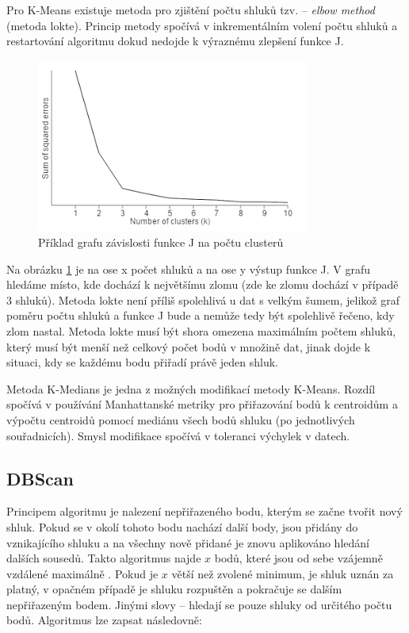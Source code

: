 \documentclass[pdftex,a4paper]{article}
\begin{document}
Pro K-Means existuje metoda pro zjištění počtu shluků tzv. -- \textit{elbow method} (metoda lokte). Princip metody spočívá v inkrementálním volení počtu shluků a restartování algoritmu dokud nedojde k výraznému zlepšení funkce J.

\begin{figure}[h]
	\centering
	\includegraphics[width=0.8\textwidth]{res/elbow.png}
	\caption{Příklad grafu závislosti funkce J na počtu clusterů}
	\label{fig:obr1}
\end{figure}

Na obrázku \ref{fig:obr1} je na ose x počet shluků a na ose y výstup funkce J. V grafu hledáme místo, kde dochází k největšímu zlomu (zde ke zlomu dochází v případě 3 shluků). Metoda lokte není příliš spolehlivá u dat s velkým šumem, jelikož graf poměru počtu shluků a funkce J bude  a nemůže tedy být spolehlivě řečeno, kdy zlom nastal. Metoda lokte musí být shora omezena maximálním počtem shluků, který musí být menší než celkový počet bodů v množině dat, jinak dojde k situaci, kdy se každému bodu přiřadí právě jeden shluk.

Metoda K-Medians je jedna z možných modifikací metody K-Means. Rozdíl spočívá v používání Manhattanské metriky pro přiřazování bodů k centroidům a výpočtu centroidů pomocí mediánu všech bodů shluku (po jednotlivých souřadnicích). Smysl modifikace spočívá v toleranci výchylek v datech.



\subsection{DBScan}
Principem algoritmu je nalezení nepřiřazeného bodu, kterým se začne tvořit nový shluk. Pokud se v \textepsilon okolí tohoto bodu nachází další body, jsou přidány do vznikajícího shluku a na všechny nově přidané je znovu aplikováno hledání dalších sousedů. Takto algoritmus najde $x$ bodů, které jsou od sebe vzájemně vzdálené maximálně \textepsilon. Pokud je $x$ větší než zvolené minimum, je shluk uznán za platný, v opačném případě je shluku rozpuštěn a pokračuje se dalším nepřiřazeným bodem. Jinými slovy -- hledají se pouze shluky od určitého počtu bodů. Algoritmus lze zapsat následovně:
\end{document}
